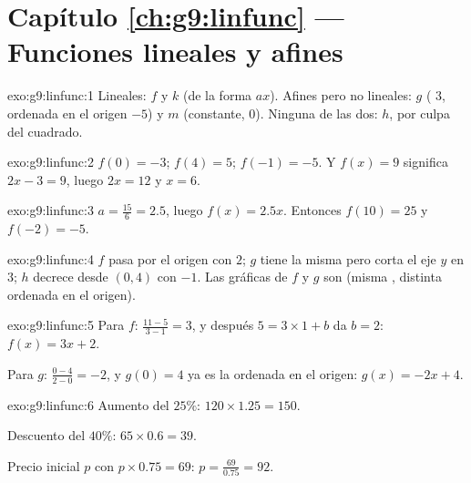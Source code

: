 \section*{Capítulo \ref{ch:g9:linfunc} --- Funciones lineales y afines}

\begin{solution}{exo:g9:linfunc:1}
Lineales: $f$ y $k$ (de la forma $ax$). Afines pero no lineales: $g$ ( $3$,
ordenada en el origen $-5$) y $m$ (constante,  $0$). Ninguna de las dos: $h$, por culpa
del cuadrado.
\end{solution}

\begin{solution}{exo:g9:linfunc:2}
$f(0) = -3$; $f(4) = 5$; $f(-1) = -5$. Y $f(x) = 9$ significa
$2x - 3 = 9$, luego $2x = 12$ y $x = 6$.
\end{solution}

\begin{solution}{exo:g9:linfunc:3}
$a = \frac{15}{6} = 2.5$, luego $f(x) = 2.5x$. Entonces $f(10) = 25$ y
$f(-2) = -5$.
\end{solution}

\begin{solution}{exo:g9:linfunc:4}
$f$ pasa por el origen con  $2$; $g$ tiene la misma  pero
corta el eje $y$ en $3$; $h$ decrece desde $(0, 4)$ con 
$-1$. Las gráficas de $f$ y $g$ son \emph{} (misma ,
distinta ordenada en el origen).
\end{solution}

\begin{solution}{exo:g9:linfunc:5}
Para $f$:  $\frac{11 - 5}{3 - 1} = 3$, y después $5 = 3 \times 1 + b$
da $b = 2$: $f(x) = 3x + 2$.

Para $g$:  $\frac{0 - 4}{2 - 0} = -2$, y $g(0) = 4$ ya es la
ordenada en el origen: $g(x) = -2x + 4$.
\end{solution}

\begin{solution}{exo:g9:linfunc:6}
Aumento del $25\%$: $120 \times 1.25 = 150$.

Descuento del $40\%$: $65 \times 0.6 = 39$.

Precio inicial $p$ con $p \times 0.75 = 69$:
$p = \frac{69}{0.75} = 92$.
\end{solution}

